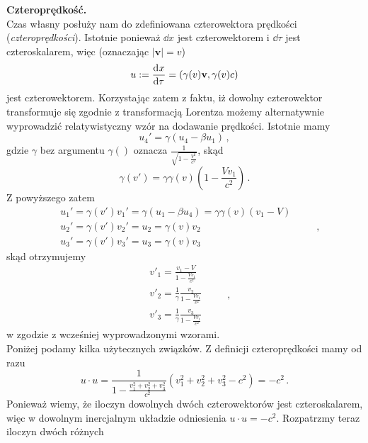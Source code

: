 \documentclass[../main.tex]{subfiles}
\begin{document}
\noindent\textbf{Czteroprędkość.}\\
Czas własny posłuży nam do zdefiniowana czterowektora prędkości (\textit{czteroprędkości}). Istotnie
ponieważ \(\dd x\) jest czterowektorem i \(\dd{\tau}\) jest czteroskalarem, więc (oznaczając
\(|\mathbf{v}|=v\))
\begin{equation*}
    u:=\dv[]{x}{\tau}=(\gamma(v)\mathbf{v},\gamma(v)c)
\end{equation*}
jest czterowektorem. Korzystając zatem z faktu, iż dowolny czterowektor transformuje się zgodnie z
transformacją Lorentza możemy alternatywnie wyprowadzić relatywistyczny wzór na dodawanie prędkości.
Istotnie mamy
\begin{equation*}
    u_4'=\gamma(u_4-\beta u_1)\,,
\end{equation*}
gdzie \(\gamma\) bez argumentu \(\gamma()\) oznacza \(\frac{1}{\sqrt{1-\frac{V^2}{c^2}}}\), skąd
\begin{equation*}
    \gamma(v')=\gamma\gamma(v)\left(1-\frac{Vv_1}{c^2}\right)\,.
\end{equation*}
Z powyższego zatem
\begin{equation*}
    \begin{split}
        &u_1'=\gamma(v')v_1'=\gamma(u_1-\beta u_4)=\gamma\gamma(v)(v_1-V)\\
        &u_2'=\gamma(v')v_2'=u_2=\gamma(v)v_2\\
        &u_3'=\gamma(v')v_3'=u_3=\gamma(v)v_3
    \end{split}\quad\quad\,,
\end{equation*}
skąd otrzymujemy
\begin{equation*}
    \begin{split}
        &v'_1=\frac{v_1-V}{1-\frac{Vv_1}{c^2}}\\
        &v'_2=\frac{1}{\gamma}\frac{v_2}{1-\frac{Vv_1}{c^2}}\\
        &v'_3=\frac{1}{\gamma}\frac{v_3}{1-\frac{Vv_1}{c^2}}
    \end{split}\quad\quad\,,
\end{equation*}
w zgodzie z wcześniej wyprowadzonymi wzorami.\\
Poniżej podamy kilka użytecznych związków. Z definicji czteroprędkości mamy od razu
\begin{equation*}
    u\cdot u=\frac{1}{1-\frac{v_1^2+v_2^2+v_3^2}{c^2}}\left(v_1^2+v_2^2+v_3^2-c^2\right)=-c^2\,.
\end{equation*}
Ponieważ wiemy, że iloczyn dowolnych dwóch czterowektorów jest czteroskalarem, więc w dowolnym
inercjalnym układzie odniesienia \(u\cdot u=-c^2\). Rozpatrzmy teraz iloczyn dwóch różnych
\end{document}
